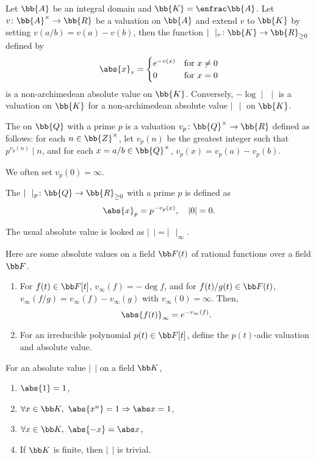 Let $\bb{A}$ be an integral domain and $\bb{K} = \enfrac\bb{A}$. Let $v\colon \bb{A}^\times \to \bb{R}$ be a valuation on $\bb{A}$ and extend $v$ to $\bb{K}$ by setting $v(a/b) = v(a) - v(b)$, then the function $\mid\ \ \mid_v \colon \bb{K} \to \bb{R}_{\ge 0}$ defined by
\[
\abs{x}_v = \begin{cases}
 e^{-v(x)} & \text{for}\ x \neq 0 \\
 0 & \text{for}\ x = 0
 \end{cases}
 \] is a non-archimedean absolute value on $\bb{K}$. Conversely, $-\log \mid \,\ \mid$ is a valuation on $\bb{K}$ for a non-archimedean absolute value $\mid\ \ \mid$ on $\bb{K}$.


The  on $\bb{Q}$ with a prime $p$ is a valuation $v_p \colon \bb{Q}^\times \to \bb{R}$ defined as follows: for each $n \in \bb{Z}^\times$, let $v_p(n)$ be the greatest integer such that $p^{v_p(n)} \mid n$, and for each $x = a / b \in \bb{Q}^\times$, $v_p(x) = v_p(a) - v_p(b)$.

We often set $v_p(0) = \infty$.

The  $\mid\ \ \mid_p \colon \bb{Q} \to \bb{R}_{\ge0}$ with a prime $p$ is defined as
\[
\abs{x}_p = p^{-v_p(x)},\quad |0| = 0.
\]

The usual absolute value is looked as $\mid\ \ \mid = \mid\ \ \mid_\infty$.


Here are some absolute values on a field $\bb F(t)$ of rational functions over a field $\bb F$.

\begin{enumerate}
\item For $f(t) \in \bb F[t]$, $v_\infty (f) = -\deg f$, and for $f(t)/g(t) \in \bb F(t)$, $v_\infty (f/g) = v_\infty(f) - v_\infty (g)$ with $v_\infty (0) = \infty$. Then,
\[
\abs{f(t)}_\infty = e^{-v_\infty (f)}.
\]
\item For an irreducible polynomial $p(t) \in \bb F[t]$, define the $p(t)$-adic valuation and absolute value.
\end{enumerate}

For an absolute value $|\ \ |$ on a field $\bb K$,
\begin{enumerate}
\item $\abs{1} = 1$,
\item $\forall x \in \bb K,\ \abs{x^n} = 1 \Rightarrow \abs x = 1$,
\item $\forall x \in \bb K,\ \abs{-x} = \abs x$,
\item If $\bb K$ is finite, then $|\ \ |$ is trivial.
\end{enumerate}

